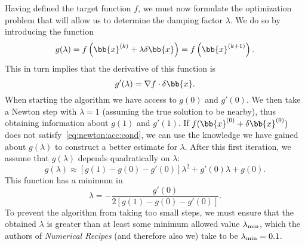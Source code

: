\documentclass{notes}
\begin{document}
    Having defined the target function $f$, we must now formulate the
    optimization problem that will allow us to determine the damping factor
    $\lambda$. We do so by introducing the function
    \begin{equation}
        g(\lambda) = f\left(\bb{x}^{(k)} + \lambda\delta\bb{x}\right) = f\left(\bb{x}^{(k+1)}\right).
    \end{equation}
    This in turn implies that the derivative of this function is
    \begin{equation}
        g'(\lambda) = \nabla f\cdot\delta\bb{x}.
    \end{equation}
    When starting the algorithm we have access to $g(0)$ and $g'(0)$. We then
    take a Newton step with $\lambda=1$ (assuming the true solution to be
    nearby), thus obtaining information about $g(1)$ and $g'(1)$. If
    $f(\bb{x}^{(0)}+\delta\bb{x}^{(0)})$ does not
    satisfy~\eqref{eq:newton:acc:cond}, we can use the knowledge we have gained
    about $g(\lambda)$ to construct a better estimate for $\lambda$. After this
    first iteration, we assume that $g(\lambda)$ depends quadratically on
    $\lambda$:
    \begin{equation}
        g(\lambda)\approx \left[ g(1)-g(0)-g'(0) \right]\lambda^2 +
        g'(0)\lambda + g(0).
    \end{equation}
    This function has a minimum in
    \begin{equation}
        \lambda = -\frac{g'(0)}{2\left[ g(1)-g(0)-g'(0) \right]}.
    \end{equation}
    To prevent the algorithm from taking too small steps, we must ensure that
    the obtained $\lambda$ is greater than at least some minimum allowed value
    $\lambda_{\rm min}$, which the authors of {\em Numerical Recipes} (and
    therefore also we) take to be $\lambda_{\rm min} = 0.1$.
\end{document}
